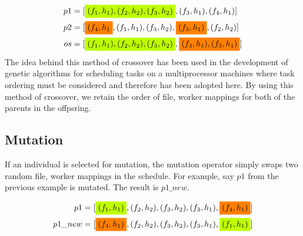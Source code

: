 \begin{align}
 p1 & = [\mathcolorbox{lime}{(f_1, h_1), (f_2, h_2), (f_3, h_2)}, (f_3, h_1), (f_4, h_1)] \nonumber \\
 p2 & = [\mathcolorbox{orange}{(f_4, h_1}, (f_1, h_1),(f_3, h_2), \mathcolorbox{orange}{(f_3, h_1)}, (f_2, h_2)] \nonumber \\
 os & = [\mathcolorbox{lime}{(f_1, h_1), (f_2, h_2), (f_3, h_2)}, \mathcolorbox{orange}{(f_4, h_1), (f_3, h_1)}] \nonumber
\end{align}
The idea behind this method of crossover has been used in the development of
genetic algorithms for scheduling tasks on a multiprocessor machines \cite{wu-incremental-genetic-04}
where task ordering must be considered and therefore has been adopted here.
By using this method of crossover, we retain the order of file, worker
mappings for both of the parents in the offpsring.

\subsection*{Mutation}
If an individual is selected for mutation, the mutation operator simply swaps
two random file, worker mappings in the schedule. For example, say $p1$ from
the previous example is mutated. The result is $p1\_new$.

\begin{align}
 p1 & = [\mathcolorbox{lime}{(f_1, h_1)}, (f_2, h_2), (f_3, h_2), (f_3, h_1), \mathcolorbox{orange}{(f_4, h_1)}] \nonumber \\
 p1\_new & = [\mathcolorbox{orange}{(f_4, h_1)}, (f_2, h_2), (f_3, h_2), (f_3, h_1),\mathcolorbox{lime}{(f_1, h_1)}] \nonumber
\end{align}
